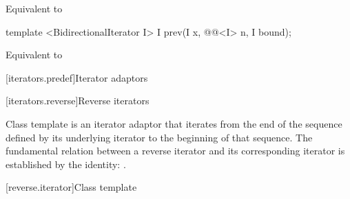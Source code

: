 \begin{itemdescr}
\pnum
\effects Equivalent to 
\end{itemdescr}

\begin{addedblock}
\begin{itemdecl}
template <BidirectionalIterator I>
  I prev(I x, @@<I> n, I bound);
\end{itemdecl}

\begin{itemdescr}
\pnum
\effects Equivalent to 
\end{itemdescr}
\end{addedblock}

[iterators.predef]{Iterator adaptors}

[iterators.reverse]{Reverse iterators}

\pnum
Class template  is an iterator adaptor that iterates from the end of the sequence defined by its underlying iterator to the beginning of that sequence.
The fundamental relation between a reverse iterator and its corresponding iterator
is established by the identity:
.

[reverse.iterator]{Class template }

